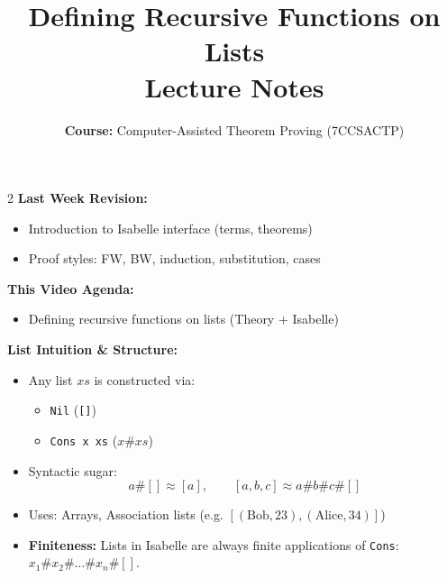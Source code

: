 \documentclass[10pt,a4paper]{article}
\title{\textbf{\huge Defining Recursive Functions on Lists}\\[0.3em]
\large Lecture Notes}
\author{\textbf{Course:} Computer-Assisted Theorem Proving (7CCSACTP)}
\date{}
\begin{document}
\maketitle
\vspace{-1.5em}

\begin{tcolorbox}[title={1. Context \& List Representation Intuition}]
\begin{multicols}{2}
\textbf{Last Week Revision:}
\begin{itemize}[leftmargin=1.2em, itemsep=2pt]
    \item Introduction to Isabelle interface (terms, theorems)
    \item Proof styles: FW, BW, induction, substitution, cases
\end{itemize}

\textbf{This Video Agenda:}
\begin{itemize}[leftmargin=1.2em, itemsep=2pt]
    \item Defining recursive functions on lists (Theory + Isabelle)
\end{itemize}

\columnbreak

\textbf{List Intuition \& Structure:}
\begin{itemize}[leftmargin=1.2em, itemsep=2pt]
    \item Any list $xs$ is constructed via:
    \begin{itemize}[leftmargin=1em, label=$\bullet$]
        \item \texttt{Nil} (\texttt{[]})
        \item \texttt{Cons x xs} ($x \# xs$)
    \end{itemize}
    \item Syntactic sugar:
    \[ a \# [] \approx [a], \qquad [a,b,c] \approx a \# b \# c \# [] \]
    \item Uses: Arrays, Association lists (e.g. $[(\text{Bob}, 23), (\text{Alice}, 34)]$)
    \item \textbf{Finiteness:} Lists in Isabelle are always finite applications of \texttt{Cons}: $x_1 \# x_2 \# \dots \# x_n \# []$.
\end{itemize}
\end{multicols}
\end{tcolorbox}

\vspace{0.3em}
\end{document}
